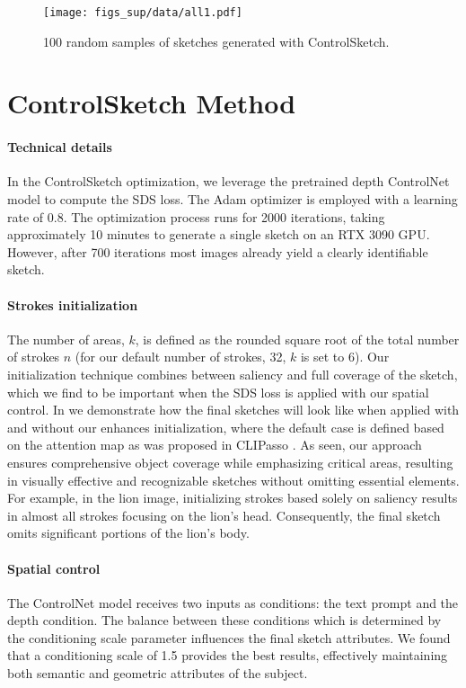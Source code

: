 {\begin{figure*}
    \centering
    \texttt{[image: figs\_sup/data/all1.pdf]}
    \caption{100 random samples of sketches generated with ControlSketch.}
    \label{fig:100ControlSketch}
\end{figure*}




\section{ControlSketch Method}
\paragraph{Technical details}
In the ControlSketch optimization, we leverage the pretrained depth ControlNet model \cite{controlnet2023} to compute the SDS loss. The Adam optimizer is employed with a learning rate of 0.8. The optimization process runs for 2000 iterations, taking approximately 10 minutes to generate a single sketch on an RTX 3090 GPU.  However, after 700 iterations most images already yield a clearly identifiable sketch.

\paragraph{Strokes initialization}
The number of areas, $k$, is defined as the rounded square root of the total number of strokes $n$ (for our default number of strokes, 32, $k$ is set to 6). 
Our initialization technique combines between saliency and full coverage of the sketch, which we find to be important when the SDS loss is applied with our spatial control. In  we demonstrate how the final sketches will look like when applied with and without our enhances initialization, where the default case is defined based on the attention map as was proposed in CLIPasso \cite{vinker2022clipasso}. As seen, our approach ensures comprehensive object coverage while emphasizing critical areas, resulting in visually effective and recognizable sketches without omitting essential elements. For example, in the lion image, initializing strokes based solely on saliency results in almost all strokes focusing on the lion's head. Consequently, the final sketch omits significant portions of the lion's body.


\paragraph{Spatial control}
The ControlNet model receives two inputs as conditions: the text prompt and the depth condition. The balance between these conditions which is determined  by the conditioning scale parameter influences the final sketch attributes. We found that a conditioning scale of 1.5 provides the best results, effectively maintaining both semantic and geometric attributes of the subject. 

}
